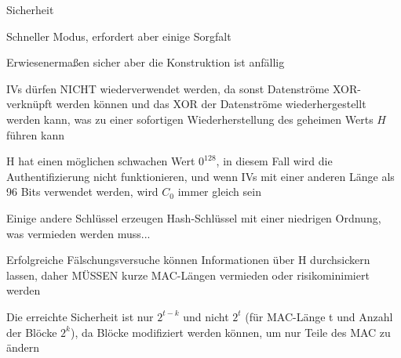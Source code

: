 \documentclass[a4paper]{article}
\begin{document}
\begin{multicols}{3}
\begin{itemize*}
            \item Sicherheit
            \begin{itemize*}
                  \item Schneller Modus, erfordert aber einige Sorgfalt
                  \item Erwiesenermaßen sicher %
                  aber die Konstruktion ist anfällig
                  \item IVs dürfen NICHT wiederverwendet werden, da sonst Datenströme XOR-verknüpft werden können und das XOR der Datenströme wiederhergestellt werden kann, was zu einer sofortigen Wiederherstellung des geheimen Werts $H$ führen kann
                  \item H hat einen möglichen schwachen Wert $0^{128}$, in diesem Fall wird die Authentifizierung nicht funktionieren, und wenn IVs mit einer anderen Länge als 96 Bits verwendet werden, wird $C_0$ immer gleich sein
                  \item Einige andere Schlüssel erzeugen Hash-Schlüssel mit einer niedrigen Ordnung, was vermieden werden muss...
                  \item Erfolgreiche Fälschungsversuche können Informationen über H durchsickern lassen, daher MÜSSEN kurze MAC-Längen vermieden oder risikominimiert werden
                  \item Die erreichte Sicherheit ist nur $2^{t-k}$ und nicht $2^t$ (für MAC-Länge t und Anzahl der Blöcke $2^k$), da Blöcke modifiziert werden können, um nur Teile des MAC zu ändern
            \end{itemize*}
      \end{itemize*}


\end{multicols}
\end{document}
